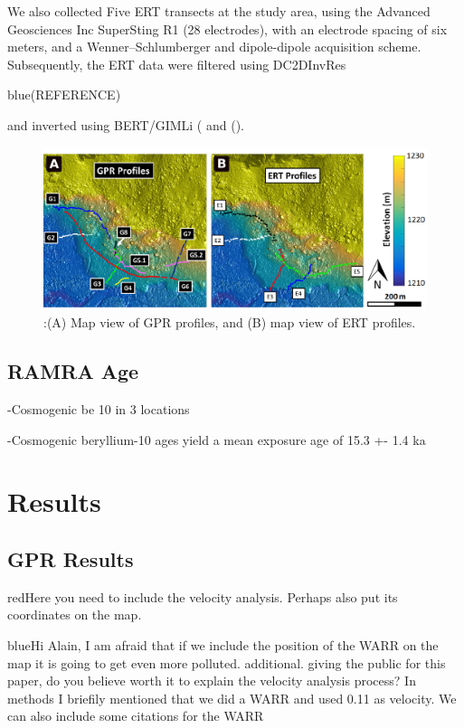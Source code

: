 \documentclass[5p]{elsarticle}
\newcommand{\COMON}{\begin{color}{blue}}
\newcommand{\COMOFF}{\end{color}}
\newcommand{\alon}{\begin{color}{red}}
\newcommand{\aloff}{\end{color}}
\begin{document}
We also collected Five ERT transects at the study area, using the Advanced Geosciences Inc SuperSting R1 (28 electrodes), with an electrode spacing of six meters, and a Wenner–Schlumberger and dipole-dipole acquisition scheme. Subsequently, the ERT data were filtered using DC2DInvRes \COMON (REFERENCE) \COMOFF and inverted using BERT/GIMLi (\cite{gunther2006three} and (\cite{Ruecker2017}).


								 \begin{figure}[h]

	\includegraphics[width=\textwidth]{Figures/GPR_ERT_Map.pdf}
		\caption{:(A) Map view of GPR profiles, and (B) map view of ERT profiles. \label{GPR_ERT_Map}}

								   \end{figure}



\subsection{RAMRA Age}

-Cosmogenic be 10 in 3 locations

-Cosmogenic beryllium-10 ages yield a mean exposure age of 15.3 +- 1.4 ka


\bigskip  

 
\section{Results}


\subsection{GPR Results}

\alon Here you need to include the velocity analysis. Perhaps also put
its coordinates on the map.\aloff


\COMON Hi Alain, I am afraid that if we include the position of the WARR on the map it is going to get even more polluted.
        additional. giving the public for this paper, do you believe worth it to explain the velocity analysis process? In methods I briefily mentioned that we did a WARR and used 0.11 as velocity. We can also include some citations for the WARR \COMOFF
\end{document}
